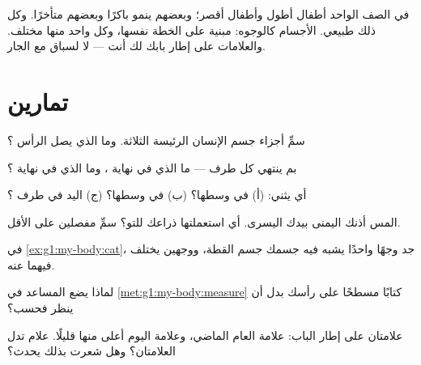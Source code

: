 \begin{remark}\label{rem:g1:my-body:different}
في الصف الواحد أطفال أطول وأطفال أقصر؛ وبعضهم ينمو باكرًا وبعضهم
متأخرًا. وكل ذلك طبيعي. الأجسام كالوجوه: مبنية على الخطة نفسها،
وكل واحد منها مختلف. والعلامات على إطار بابك لك أنت --- لا لسباق
مع الجار.
\end{remark}

\section{تمارين}

\begin{exercise}[$\star$]\label{exo:g1:my-body:1}
سمِّ أجزاء جسم الإنسان الرئيسة الثلاثة. وما الذي يصل الرأس ؟
\end{exercise}

\begin{exercise}[$\star$]\label{exo:g1:my-body:2}
بم ينتهي كل طرف --- ما الذي في نهاية ، وما الذي في نهاية
؟
\end{exercise}

\begin{exercise}[$\star$]\label{exo:g1:my-body:3}
أي  يثني: (أ)  في وسطها؟ (ب)  في وسطها؟ (ج) اليد
في طرف ؟
\end{exercise}

\begin{exercise}[$\star$]\label{exo:g1:my-body:4}
المس أذنك اليمنى بيدك اليسرى. أي  استعملتها ذراعك للتو؟ سمِّ
مفصلين على الأقل.
\end{exercise}

\begin{exercise}[$\star$]\label{exo:g1:my-body:5}
في \cref{ex:g1:my-body:cat}، جد وجهًا واحدًا يشبه فيه جسمك جسم
القطة، ووجهين يختلف فيهما عنه.
\end{exercise}

\begin{exercise}[$\star$]\label{exo:g1:my-body:6}
لماذا يضع المساعد في \cref{met:g1:my-body:measure} كتابًا مسطحًا
على رأسك بدل أن ينظر فحسب؟
\end{exercise}

\begin{exercise}[$\star$]\label{exo:g1:my-body:7}
علامتان على إطار الباب: علامة العام الماضي، وعلامة اليوم أعلى
منها قليلًا. علام تدل العلامتان؟ وهل شعرت بذلك يحدث؟
\end{exercise}

